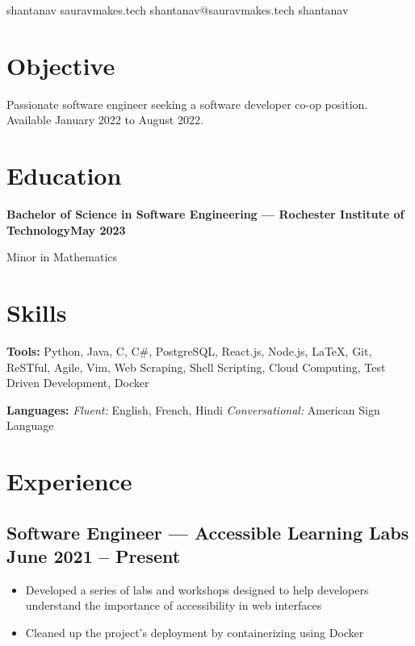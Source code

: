 \documentclass[11pt, letterpaper]{article}
\makeatletter
\renewcommand{\maketitle} {
    \thispagestyle{empty}
    \begin{center}    
        \huge\bfseries \theauthor
    \end{center}
    \faGithub \hspace{4px} {\large shantanav} \hfill
    \faDesktop \hspace{4px} {\large sauravmakes.tech} \hfill
    \faEnvelope \hspace{4px} {\large shantanav@sauravmakes.tech} \hfill
    \faLinkedin \hspace{4px} {\large shantanav}
}
\makeatother
\begin{document}
    \author{Shantanav Saurav}
    \maketitle

    \section{Objective}
        Passionate software engineer seeking a software developer co-op position. 
        Available January 2022 to August 2022.
    \section{Education}
        \textbf{Bachelor of Science in Software Engineering --- Rochester Institute of Technology\hfill May 2023} 
        
        Minor in Mathematics

    \section{Skills}
        \textbf{Tools:}
            Python, Java, C, C\#, PostgreSQL, React.js, Node.js, LaTeX, Git, ReSTful, Agile, Vim,
            Web Scraping, Shell Scripting, Cloud Computing, Test Driven Development, Docker

        \textbf{Languages:} \hspace{0px}
            \emph{Fluent:} English, French, Hindi \hspace{4px}
            \emph{Conversational:} American Sign Language

    \section{Experience}
        \subsection{Software Engineer --- Accessible Learning Labs \hfill June 2021 -- Present}
            \begin{itemize}[nosep]
                \item Developed a series of labs and workshops designed to help developers understand
                    the importance of accessibility in web interfaces
                \item Cleaned up the project's deployment by containerizing using Docker
            \end{itemize}
\end{document}
